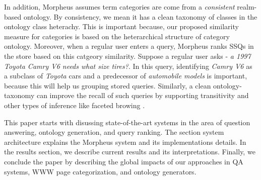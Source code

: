 In addition, Morpheus assumes term categories are come from a \textit{consistent} realm-based ontology. By consistency, we mean it has a clean taxonomy of classes in the ontology class heterachy. This is important because, our proposed similarity measure for categories is based on the heterarchical structure of category ontology. Moreover, when a regular user enters a query, Morpheus ranks SSQs in the store based on this catgeory similarity. Suppose a regular user asks -\textit{ a 1997 Toyota Camry V6 needs what size tires?}. In this query, identifying \textit{Camry V6} as a subclass of \textit{Toyota} cars and a predecessor of \textit{automobile models} is important, because this will help us grouping stored queries. Similarly, a clean ontology-taxonomy can improve the recall of such queries by supporting transitivity and other types of inference like faceted browing \cite{Wu2008}.    

This paper starts with disussing state-of-the-art systems in the area of question answering, ontology generation, and query ranking. The section system architecture explains the Morpheus system and its implementations details. In the results section, we describe current results and its interpretations. Finally, we conclude the paper by describing the global impacts of our approaches in QA systems, WWW page categorization, and ontology generators. 
